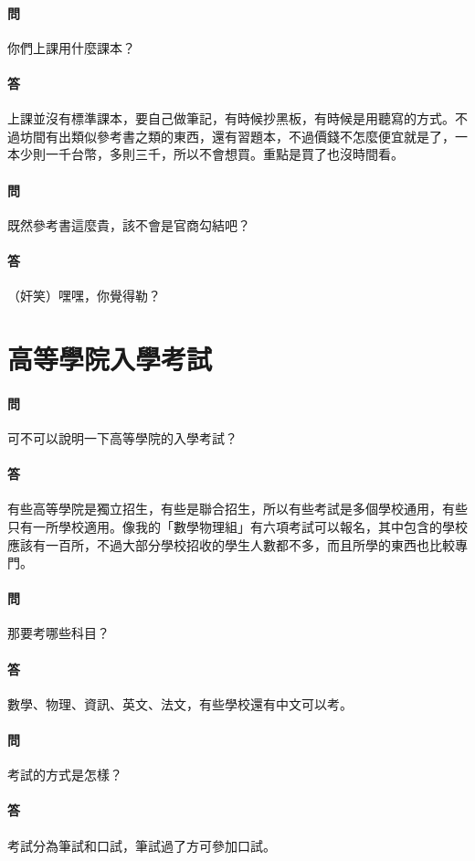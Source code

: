 \documentclass[a4paper]{article}
\begin{document}
\paragraph{問}
你們上課用什麼課本？
\paragraph{答}
上課並沒有標準課本，要自己做筆記，有時候抄黑板，有時候是用聽寫的方式。不過坊間有出類似參考書之類的東西，還有習題本，不過價錢不怎麼便宜就是了，一本少則一千台幣，多則三千，所以不會想買。重點是買了也沒時間看。
\paragraph{問}
既然參考書這麼貴，該不會是官商勾結吧？
\paragraph{答}
（奸笑）嘿嘿，你覺得勒？

\section{高等學院入學考試}
\paragraph{問}
可不可以說明一下高等學院的入學考試？
\paragraph{答}
有些高等學院是獨立招生，有些是聯合招生，所以有些考試是多個學校通用，有些只有一所學校適用。像我的「數學物理組」有六項考試可以報名，其中包含的學校應該有一百所，不過大部分學校招收的學生人數都不多，而且所學的東西也比較專門。
\paragraph{問}
那要考哪些科目？
\paragraph{答}
數學、物理、資訊、英文、法文，有些學校還有中文可以考。
\paragraph{問}
考試的方式是怎樣？
\paragraph{答}
考試分為筆試和口試，筆試過了方可參加口試。
\end{document}

